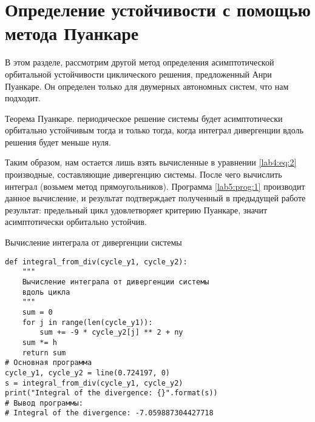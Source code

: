 \chapter{Определение устойчивости с помощью метода Пуанкаре}\label{lab5}

В этом разделе, рассмотрим другой метод определения асимптотической орбитальной
устойчивости циклического решения, предложенный Анри Пуанкаре. Он определен
только для двумерных автономных систем, что нам подходит.

\begin{theorem}
    Теорема Пуанкаре.
    периодическое решение системы будет асимптотически
    орбитально устойчивым тогда и только тогда, когда интеграл дивергенции вдоль
    решения будет меньше нуля.
\end{theorem}

Таким образом, нам остается лишь взять вычисленные в уравнении \eqref{lab4:eq:2}
производные, составляющие дивергенцию системы. После чего вычислить интеграл
(возьмем метод прямоугольников). Программа \ref{lab5:prog:1} производит данное
вычисление, и результат подтверждает полученный в предыдущей работе результат:
предельный цикл удовлетворяет критерию Пуанкаре, значит асимптотически орбитально
устойчив.

\begin{program}
    \caption{Вычисление интеграла от дивергенции системы}
    \label{lab5:prog:1}
    \begin{verbatim}
def integral_from_div(cycle_y1, cycle_y2):
    """
    Вычисление интеграла от дивергенции системы
    вдоль цикла
    """
    sum = 0
    for j in range(len(cycle_y1)):
        sum += -9 * cycle_y2[j] ** 2 + ny
    sum *= h
    return sum
# Основная программа
cycle_y1, cycle_y2 = line(0.724197, 0)
s = integral_from_div(cycle_y1, cycle_y2)
print("Integral of the divergence: {}".format(s))
# Вывод программы:
# Integral of the divergence: -7.059887304427718
    \end{verbatim}
\end{program}